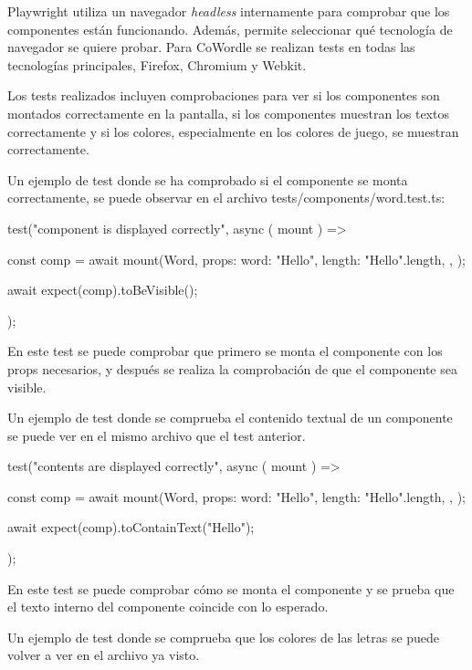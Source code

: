 Playwright utiliza un navegador \textit{headless} internamente para comprobar que los componentes están funcionando. Además, permite seleccionar qué tecnología de navegador se quiere probar. Para CoWordle se realizan tests en todas las tecnologías principales, Firefox, Chromium y Webkit.

Los tests realizados incluyen comprobaciones para ver si los componentes son montados correctamente en la pantalla, si los componentes muestran los textos correctamente y si los colores, especialmente en los colores de juego, se muestran correctamente.

Un ejemplo de test donde se ha comprobado si el componente se monta correctamente, se puede observar en el archivo tests/components/word.test.ts:

\begin{mytypescript}[float={!h},caption={Ejemplo test visibilidad componente.},label={alg:test_visibility}]
	test("component is displayed correctly", async ({ mount }) => {
		const comp = await mount(Word, {
			props: {
				word: "Hello",
				length: "Hello".length,
			},
		});

		await expect(comp).toBeVisible();
	});
\end{mytypescript}

En este test se puede comprobar que primero se monta el componente con los props necesarios, y después se realiza la comprobación de que el componente sea visible.

Un ejemplo de test donde se comprueba el contenido textual de un componente se puede ver en el mismo archivo que el test anterior.

\begin{mytypescript}[float={!h},caption={Ejemplo test con texto.},label={alg:test_text}]
	test("contents are displayed correctly", async ({ mount }) => {
		const comp = await mount(Word, {
			props: {
				word: "Hello",
				length: "Hello".length,
			},
		});


		await expect(comp).toContainText("Hello");
	});
\end{mytypescript}

En este test se puede comprobar cómo se monta el componente y se prueba que el texto interno del componente coincide con lo esperado.

Un ejemplo de test donde se comprueba que los colores de las letras se puede volver a ver en el archivo ya visto.

